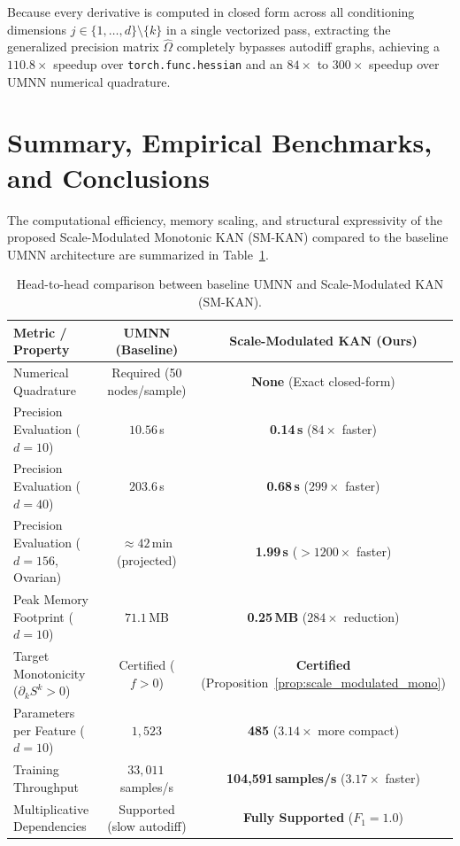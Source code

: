 \documentclass[11pt,a4paper]{article}
\theoremstyle{plain}
\theoremstyle{definition}
\theoremstyle{remark}
\begin{document}
Because every derivative is computed in closed form across all conditioning dimensions $j \in \{1, \dots, d\} \setminus \{k\}$ in a single vectorized pass, extracting the generalized precision matrix $\widehat{\Omega}$ completely bypasses autodiff graphs, achieving a $110.8\times$ speedup over \texttt{torch.func.hessian} and an $84\times$ to $300\times$ speedup over UMNN numerical quadrature.

\section{Summary, Empirical Benchmarks, and Conclusions}
\label{sec:empirical_evaluation}

The computational efficiency, memory scaling, and structural expressivity of the proposed Scale-Modulated Monotonic KAN (SM-KAN) compared to the baseline UMNN architecture are summarized in Table~\ref{tab:comparison}.
\begin{table}[H]
\centering
\footnotesize
\setlength{\tabcolsep}{4.5pt}
\caption{Head-to-head comparison between baseline UMNN and Scale-Modulated KAN (SM-KAN).}
\label{tab:comparison}
\begin{tabular}{lcc}
\toprule
\textbf{Metric / Property} & \textbf{UMNN (Baseline)} & \textbf{Scale-Modulated KAN (Ours)} \\
\midrule
Numerical Quadrature & Required (50 nodes/sample) & \textbf{None} (Exact closed-form) \\
Precision Evaluation ($d=10$) & $10.56$\,s & \textbf{0.14\,s} ($84\times$ faster) \\
Precision Evaluation ($d=40$) & $203.6$\,s & \textbf{0.68\,s} ($299\times$ faster) \\
Precision Evaluation ($d=156$, Ovarian) & $\approx 42$\,min (projected) & \textbf{1.99\,s} ($>1200\times$ faster) \\
Peak Memory Footprint ($d=10$) & $71.1$\,MB & \textbf{0.25\,MB} ($284\times$ reduction) \\
Target Monotonicity ($\partial_k S^k > 0$) & Certified ($f > 0$) & \textbf{Certified} (Proposition~\ref{prop:scale_modulated_mono}) \\
Parameters per Feature ($d=10$) & $1{,}523$ & \textbf{485} ($3.14\times$ more compact) \\
Training Throughput & $33{,}011$\,samples/s & \textbf{104{,}591\,samples/s} ($3.17\times$ faster) \\
Multiplicative Dependencies & Supported (slow autodiff) & \textbf{Fully Supported} ($F_1 = 1.0$) \\
\bottomrule
\end{tabular}
\end{table}
\end{document}
